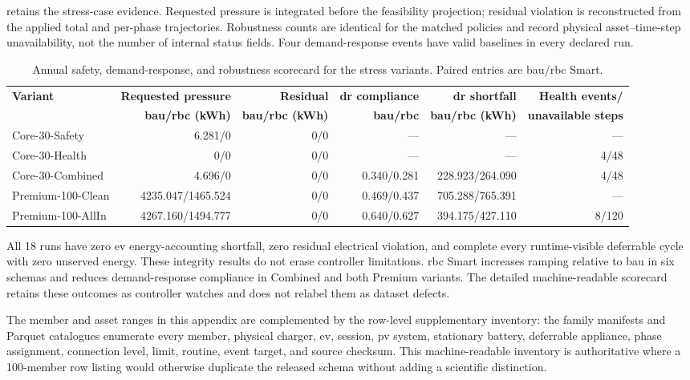  retains the stress-case evidence. Requested pressure is integrated before the feasibility projection; residual violation is reconstructed from the applied total and per-phase trajectories. Robustness counts are identical for the matched policies and record physical asset--time-step unavailability, not the number of internal status fields. Four demand-response events have valid baselines in every declared run.

\begin{table}[htbp]
\centering
\caption{Annual safety, demand-response, and robustness scorecard for the stress variants. Paired entries are \gls{bau}/\gls{rbc} Smart.}
\label{tab:app-annual-stress-scorecard}
\scriptsize
\begin{tabular}{@{}lrrrrr@{}}
\toprule
\textbf{Variant} & \textbf{Requested pressure} & \textbf{Residual} & \textbf{\gls{dr} compliance} & \textbf{\gls{dr} shortfall} & \textbf{Health events/} \\
 & \textbf{\gls{bau}/\gls{rbc} (kWh)} & \textbf{\gls{bau}/\gls{rbc} (kWh)} & \textbf{\gls{bau}/\gls{rbc}} & \textbf{\gls{bau}/\gls{rbc} (kWh)} & \textbf{unavailable steps} \\
\midrule
Core-30-Safety & 6.281/0 & 0/0 & --- & --- & --- \\
Core-30-Health & 0/0 & 0/0 & --- & --- & 4/48 \\
Core-30-Combined & 4.696/0 & 0/0 & 0.340/0.281 & 228.923/264.090 & 4/48 \\
Premium-100-Clean & 4235.047/1465.524 & 0/0 & 0.469/0.437 & 705.288/765.391 & --- \\
Premium-100-AllIn & 4267.160/1494.777 & 0/0 & 0.640/0.627 & 394.175/427.110 & 8/120 \\
\bottomrule
\end{tabular}
\end{table}

All 18 runs have zero \gls{ev} energy-accounting shortfall, zero residual electrical violation, and complete every runtime-visible deferrable cycle with zero unserved energy. These integrity results do not erase controller limitations. \gls{rbc} Smart increases ramping relative to \gls{bau} in six schemas and reduces demand-response compliance in Combined and both Premium variants. The detailed machine-readable scorecard retains these outcomes as controller watches and does not relabel them as dataset defects.

The member and asset ranges in this appendix are complemented by the row-level supplementary inventory: the family manifests and Parquet catalogues enumerate every member, physical charger, \gls{ev}, session, \gls{pv} system, stationary battery, deferrable appliance, phase assignment, connection level, limit, routine, event target, and source checksum. This machine-readable inventory is authoritative where a 100-member row listing would otherwise duplicate the released schema without adding a scientific distinction.

